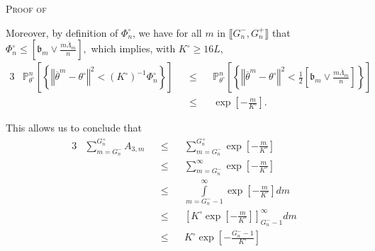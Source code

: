 \begin{pro}{\textsc{Proof of } \\}
\medskip

Moreover, by definition of $\Phi_{n}^{\circ}$, we have for all $m$ in $\llbracket G_{n}^{-}, G_{n}^{+}\rrbracket$ that $\Phi_{n}^{\circ} \leq \left[\mathfrak{b}_{m} \vee \frac{m \overline{\Lambda}_{m}}{n}\right],$ which implies, with $K^{\circ} \geq 16 L,$
\begin{alignat*}{3}
& \mathds{P}_{\theta^{\circ}}^{n}\left[\left\{\left\Vert \overline{\theta}^{m} - \theta^{\circ}\right\Vert^{2} < \left(K^{\circ}\right)^{-1} \Phi_{n}^{\circ}\right\}\right] && \leq && \mathds{P}_{\theta^{\circ}}^{n}\left[\left\{\left\Vert \overline{\theta}^{m} - \theta^{\circ}\right\Vert^{2} < \frac{1}{2} \left[\mathfrak{b}_{m} \vee \frac{m \overline{\Lambda}_{m}}{n}\right]\right\}\right]\\
& && \leq && \exp\left[-\frac{m}{K^{\circ}}\right].
\end{alignat*}

This allows us to conclude that
\begin{alignat*}{3}
& \sum\limits_{m = G_{n}^{-}}^{G_{n}^{+}} A_{3, m} && \leq && \sum\limits_{m = G_{n}^{-}}^{G_{n}^{+}} \exp\left[-\frac{m}{K^{\circ}}\right]\\
& && \leq && \sum\limits_{m = G_{n}^{-}}^{\infty} \exp\left[-\frac{m}{K^{\circ}}\right]\\
& && \leq && \int\limits_{m = G_{n}^{-}-1}^{\infty} \exp\left[-\frac{m}{K^{\circ}}\right] dm\\
& && \leq && \left[K^{\circ} \exp\left[-\frac{m}{K^{\circ}}\right]\right]_{G_{n}^{-}-1}^{\infty} dm\\
& && \leq && K^{\circ} \exp\left[-\frac{G_{n}^{-} - 1}{K^{\circ}}\right]
\end{alignat*}

\bigskip


\end{pro}
